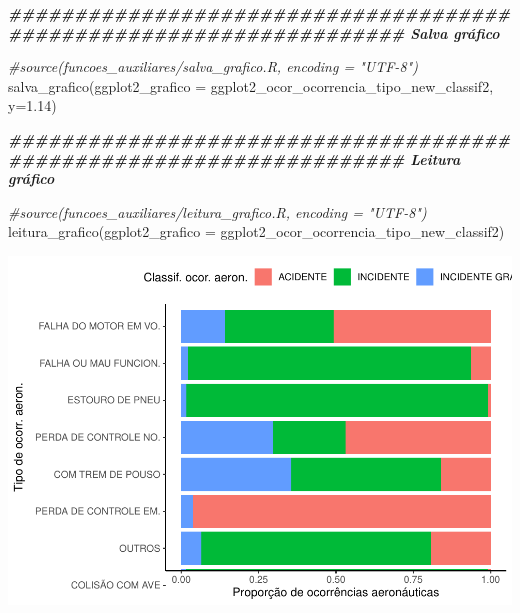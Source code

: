 \documentclass[
]{article}
\newenvironment{Shaded}{\begin{snugshade}}{\end{snugshade}}
\newcommand{\AttributeTok}[1]{\textcolor[rgb]{0.77,0.63,0.00}{#1}}
\newcommand{\CommentTok}[1]{\textcolor[rgb]{0.56,0.35,0.01}{\textit{#1}}}
\newcommand{\DocumentationTok}[1]{\textcolor[rgb]{0.56,0.35,0.01}{\textbf{\textit{#1}}}}
\newcommand{\FloatTok}[1]{\textcolor[rgb]{0.00,0.00,0.81}{#1}}
\newcommand{\FunctionTok}[1]{\textcolor[rgb]{0.00,0.00,0.00}{#1}}
\newcommand{\NormalTok}[1]{#1}
\begin{document}
\begin{Shaded}
\begin{Highlighting}[]
\DocumentationTok{\#\#\#\#\#\#\#\#\#\#\#\#\#\#\#\#\#\#\#\#\#\#\#\#\#\#\#\#\#\#\#\#\#\#\#\#\#\#\#\#\#\#\#\#\#\#\#\#\#\#\#\#\#\#\#\#\#\#\#\#\#\#\#\#\#\#\#\# Salva gráfico}

\CommentTok{\#source(\textquotesingle{}funcoes\_auxiliares/salva\_grafico.R\textquotesingle{}, encoding = "UTF{-}8")}
\FunctionTok{salva\_grafico}\NormalTok{(}\AttributeTok{ggplot2\_grafico =}\NormalTok{ ggplot2\_ocor\_ocorrencia\_tipo\_new\_classif2, }\AttributeTok{y=}\FloatTok{1.14}\NormalTok{)}

\DocumentationTok{\#\#\#\#\#\#\#\#\#\#\#\#\#\#\#\#\#\#\#\#\#\#\#\#\#\#\#\#\#\#\#\#\#\#\#\#\#\#\#\#\#\#\#\#\#\#\#\#\#\#\#\#\#\#\#\#\#\#\#\#\#\#\#\#\#\#\#\# Leitura gráfico}

\CommentTok{\#source(\textquotesingle{}funcoes\_auxiliares/leitura\_grafico.R\textquotesingle{}, encoding = "UTF{-}8")}
\FunctionTok{leitura\_grafico}\NormalTok{(}\AttributeTok{ggplot2\_grafico =}\NormalTok{ ggplot2\_ocor\_ocorrencia\_tipo\_new\_classif2)}
\end{Highlighting}
\end{Shaded}

\begin{center}\includegraphics{4.Relatorio/pdf/index_files/figure-latex/unnamed-chunk-48-1} \end{center}
\end{document}
